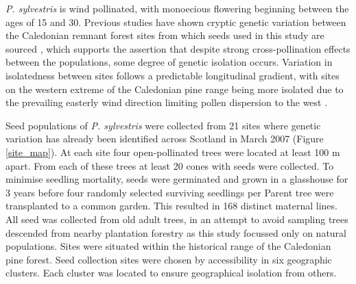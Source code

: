 \documentclass[a4paper, 11pt]{article}
\begin{document}
\textit{P. sylvestris} is wind pollinated, with monoecious flowering beginning between the ages of 15 and 30. Previous studies have shown cryptic genetic variation between the Caledonian remnant forest sites from which seeds used in this study are sourced \citep{Donnelly2018}, which supports the assertion that despite strong cross-pollination effects between the populations, some degree of genetic isolation occurs. Variation in isolatedness between sites follows a predictable longitudinal gradient, with sites on the western extreme of the Caledonian pine range being more isolated due to the prevailing easterly wind direction limiting pollen dispersion to the west \citep{Gonzalez2018}. 

Seed populations of \textit{P. sylvestris} were collected from 21 sites where genetic variation has already been identified across Scotland in March 2007 (Figure \ref{site_map}). At each site four open-pollinated trees were located at least 100 m apart. From each of these trees at least 20 cones with seeds were collected. To minimise seedling mortality, seeds were germinated and grown in a glasshouse for 3 years before four randomly selected surviving seedlings per Parent tree were transplanted to a common garden. This resulted in 168 distinct maternal lines. All seed was collected from old adult trees, in an attempt to avoid sampling trees descended from nearby plantation forestry as this study focussed only on natural populations. Sites were situated within the historical range of the Caledonian pine forest. Seed collection sites were chosen by accessibility in six geographic clusters. Each cluster was located to ensure geographical isolation from others. 
\end{document}
